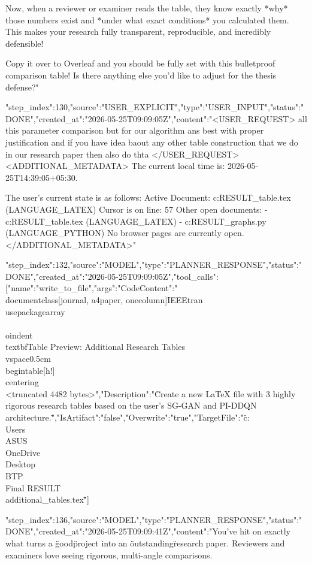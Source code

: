 \begin{table}[t]
{\begin{table}[t]
{{{{{{{{{{{{Now, when a reviewer or examiner reads the table, they know exactly *why* those numbers exist and *under what exact conditions* you calculated them. This makes your research fully transparent, reproducible, and incredibly defensible! 

Copy it over to Overleaf and you should be fully set with this bulletproof comparison table! Is there anything else you'd like to adjust for the thesis defense?"}
{"step_index":130,"source":"USER_EXPLICIT","type":"USER_INPUT","status":"DONE","created_at":"2026-05-25T09:09:05Z","content":"<USER_REQUEST>
 all this parameter comparison but for our algorithm ans best with proper justification and if you have idea baout any other table construction that we do in our research paper then also do thta 
</USER_REQUEST>
<ADDITIONAL_METADATA>
The current local time is: 2026-05-25T14:39:05+05:30.

The user's current state is as follows:
Active Document: c:\Users\ASUS\OneDrive\Desktop\BTP\Final RESULT\comparison_table.tex (LANGUAGE_LATEX)
Cursor is on line: 57
Other open documents:
- c:\Users\ASUS\OneDrive\Desktop\BTP\Final RESULT\comparison_table.tex (LANGUAGE_LATEX)
- c:\Users\ASUS\OneDrive\Desktop\BTP\Final RESULT\generate_graphs.py (LANGUAGE_PYTHON)
No browser pages are currently open.
</ADDITIONAL_METADATA>"}
{"step_index":132,"source":"MODEL","type":"PLANNER_RESPONSE","status":"DONE","created_at":"2026-05-25T09:09:05Z","tool_calls":[{"name":"write_to_file","args":{"CodeContent":"\"\\documentclass[journal, a4paper, onecolumn]{IEEEtran}\
\\usepackage{array}\
\
\\
\
\\
oindent \\textbf{Table Preview: Additional Research Tables}\
\
\\vspace{0.5cm}\
\
\\begin{table}[h!]\
\\centering\
\\
<truncated 4482 bytes>","Description":"\"Create a new LaTeX file with 3 highly rigorous research tables based on the user's SG-GAN and PI-DDQN architecture.\"","IsArtifact":"false","Overwrite":"true","TargetFile":"\"c:\\Users\\ASUS\\OneDrive\\Desktop\\BTP\\Final RESULT\\additional_tables.tex\""}}]}
{"step_index":136,"source":"MODEL","type":"PLANNER_RESPONSE","status":"DONE","created_at":"2026-05-25T09:09:41Z","content":"You've hit on exactly what turns a \"good\" project into an \"outstanding\" research paper. Reviewers and examiners love seeing rigorous, multi-angle comparisons.

}}}}}}}}}}}}
\end{table}}
\end{table}
